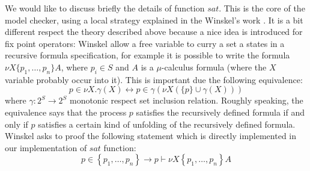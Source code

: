 We would like to discuss briefly the details of function $sat$. This
is the core of the model checker, using a local strategy explained in
the Winskel's work \cite{Winskel1991157}. It is a bit different
respect the theory described above because a nice idea is introduced
for fix point operators: Winskel allow a free variable to curry a set
a states in a recursive formula specification, for example it is
possible to write the formula $\nu X\{p_1,\ldots,p_n\} A$, where $p_i
\in S$ and $A$ is a $\mu$-calculus formula (where the $X$ variable
probably occur into it). This is important due the following
equivalence:
\begin{displaymath}
  p \in \nu X.\gamma(X) \leftrightarrow p \in \gamma (\nu X(\{p\}\cup\gamma(X)))
\end{displaymath}
where $\gamma : 2^S \rightarrow 2^S$ monotonic respect set inclusion
relation. Roughly speaking, the equivalence says that the process $p$
satisfies the recursively defined formula if and only if $p$ satisfies
a certain kind of unfolding of the recursively defined
formula. Winskel asks to proof the following statement which is
directly implemented in our implementation of $sat$ function:
\begin{displaymath}
  p \in \left \lbrace p_1,\ldots,p_n\right\rbrace \rightarrow
  p \vdash \nu X \left \lbrace p_1,\ldots,p_n\right\rbrace A
\end{displaymath}

